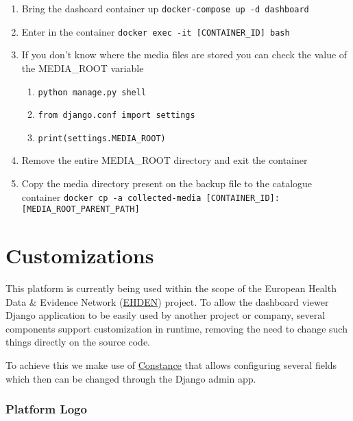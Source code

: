 \documentclass[
]{book}
\begin{document}
\begin{enumerate}
\begin{enumerate}
    \begin{enumerate}
    \def\labelenumiii{\arabic{enumiii}.}
    \item
      Bring the dashoard container up \texttt{docker-compose\ up\ -d\ dashboard}
    \item
      Enter in the container \texttt{docker\ exec\ -it\ {[}CONTAINER\_ID{]}\ bash}
    \item
      If you don't know where the media files are stored you can check the value of the MEDIA\_ROOT variable

      \begin{enumerate}
      \def\labelenumiv{\arabic{enumiv}.}
      \item
        \texttt{python\ manage.py\ shell}
      \item
        \texttt{from\ django.conf\ import\ settings}
      \item
        \texttt{print(settings.MEDIA\_ROOT)}
      \end{enumerate}
    \item
      Remove the entire MEDIA\_ROOT directory and exit the container
    \item
      Copy the media directory present on the backup file to the catalogue container \texttt{docker\ cp\ -a\ collected-media\ {[}CONTAINER\_ID{]}:{[}MEDIA\_ROOT\_PARENT\_PATH{]}}
    \end{enumerate}
  \end{enumerate}
\end{enumerate}

\hypertarget{customizations}{%
\chapter{Customizations}\label{customizations}}

This platform is currently being used within the scope of the European Health Data \& Evidence Network (\href{https://www.ehden.eu/}{EHDEN}) project.
To allow the dashboard viewer Django application to be easily used by another project or company, several components support customization in runtime, removing the need to change such things directly on the source code.

To achieve this we make use of \href{https://github.com/jazzband/django-constance}{Constance} that allows configuring several fields which then can be changed through the Django admin app.

\hypertarget{platform-logo}{%
\subsection*{Platform Logo}\label{platform-logo}}
\end{document}
